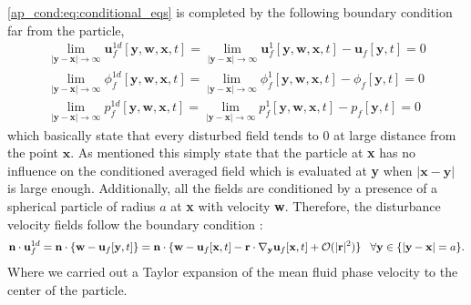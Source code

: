 \ref{ap_cond:eq:conditional_eqs} is completed by the following boundary condition far from the particle, 
\begin{align*}
    \lim_{|\textbf{y}-\textbf{x}|\to\infty} 
    \textbf{u}^{1d}_f[\textbf{y},\textbf{w},\textbf{x},t] 
    = 
    \lim_{|\textbf{y}-\textbf{x}|\to\infty} 
    \textbf{u}^{1}_f[\textbf{y},\textbf{w},\textbf{x},t] 
    - \textbf{u}_f[\textbf{y},t] 
    = 0 \\
    \lim_{|\textbf{y}-\textbf{x}|\to\infty} 
    \phi_f^{1d}[\textbf{y},\textbf{w},\textbf{x},t] 
    = 
    \lim_{|\textbf{y}-\textbf{x}|\to\infty} 
    \phi_f^{1}[\textbf{y},\textbf{w},\textbf{x},t] 
    - \phi_f[\textbf{y},t] 
    = 0 \\
    \lim_{|\textbf{y}-\textbf{x}|\to\infty} 
    p^{1d}_f[\textbf{y},\textbf{w},\textbf{x},t] 
    = 
    \lim_{|\textbf{y}-\textbf{x}|\to\infty} 
    p^{1}_f[\textbf{y},\textbf{w},\textbf{x},t] 
    - p_f[\textbf{y},t] 
    = 0 
    \label{eq:boundary_at_infinity}
\end{align*}
which basically state that every disturbed field tends to $0$ at large distance from the point $\textbf{x}$. 
As mentioned this simply state that the particle at \textbf{x} has no influence on the conditioned averaged field which is evaluated at \textbf{y} when $|\textbf{x}-\textbf{y}|$ is large enough. 
Additionally, all the fields are conditioned by a presence of a spherical particle of radius $a$ at \textbf{x} with velocity \textbf{w}.
Therefore, the disturbance velocity fields follow the boundary condition :
\begin{align*}
    \textbf{n}\cdot\textbf{u}^{1d}_f
    = \textbf{n}\cdot\{\textbf{w} - \textbf{u}_f[\textbf{y},t]\}
    = \textbf{n}\cdot\{
    \textbf{w} 
    - \textbf{u}_f[\textbf{x},t]
    -\textbf{r} \cdot {\mathbf{\nabla}_\textbf{y}}\textbf{u}_f[\textbf{x},t] 
    + \mathcal{O}(|\textbf{r}|^2)
    \}
    \;\;\; \forall \textbf{y} \in \{ |\textbf{y}-\textbf{x}| = a \}. 
\end{align*}
Where we carried out a Taylor expansion of the mean fluid phase velocity to the center of the particle. 

